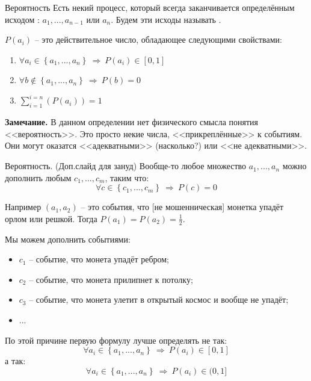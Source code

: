 \begin{frame}{Вероятность}
	Есть некий процесс, который всегда заканчивается определённым исходом : $a_1, ..., a_{n-1}$ или $a_n$.
	Будем эти исходы называть .
	
	 $P(a_i)$ -- это действительное число, обладающее следующими свойствами:
\begin{enumerate}
	\item $\forall a_i \in \left\{a_1, ..., a_n \right\} ~\Longrightarrow~ P(a_i) \in [0, 1]$
	\item $\forall b \notin \left\{a_1, ..., a_n \right\} ~\Longrightarrow~ P(b) = 0$
	\item $\sum_{i=1}^{i=n}\left(P(a_i)\right) = 1$
\end{enumerate}


\textbf{Замечание.}
В данном определении нет физического смысла понятия 
<<вероятность>>. Это просто некие числа, 
<<прикреплённые>> к событиям.
Они могут оказатся <<адекватными>> (насколько?)
или <<не адекватными>>.

\end{frame}

\begin{frame}{Вероятность. (Доп.слайд для зануд)}
\footnotesize
Вообще-то любое множество ${a_1, ..., a_n}$  
можно дополнить любым ${c_1, ..., c_m}$, 
таким что:
\begin{equation*}
	 \forall c \in \left\{c_1, ..., c_m \right\} ~\Longrightarrow~ P(c) = 0
\end{equation*}

Например $(a_1, a_2)$ -- это события, 
что [не мошенническая] монетка
упадёт орлом или решкой. Тогда $P(a_1) = P(a_2) = \frac{1}{2}$.

Мы можем дополнить событиями:
\begin{itemize}
	\item $c_1$ -- событие, что монета упадёт ребром;
	\item $c_2$ -- событие, что монета прилипнет к потолку;
	\item $c_3$ -- событие, что монета улетит в открытый космос и вообще не упадёт;
	\item ... 
\end{itemize}

По этой причине первую формулу лучше определять не так:
\begin{equation*}
 \forall a_i \in \left\{a_1, ..., a_n \right\} ~\Longrightarrow~ P(a_i) \in [0, 1]
\end{equation*}
а так:
\begin{equation*}
\forall a_i \in \left\{a_1, ..., a_n \right\} ~\Longrightarrow~ P(a_i) \in (0, 1]
\end{equation*}

\end{frame}

